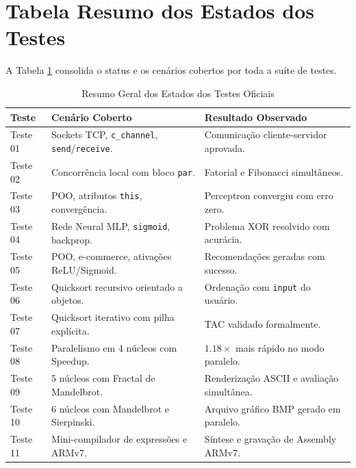 \section{Tabela Resumo dos Estados dos Testes}

A Tabela \ref{tab:resumo_testes} consolida o status e os cenários cobertos por toda a suíte de testes.

\begin{table}[htbp]
\centering
\caption{Resumo Geral dos Estados dos Testes Oficiais}
\label{tab:resumo_testes}
\small
\begin{tabular}{p{2cm}p{6cm}p{5.5cm}}
\toprule
Teste & Cenário Coberto & Resultado Observado \\
\midrule
Teste 01 & Sockets TCP, \texttt{c\_channel}, \texttt{send}/\texttt{receive}. & Comunicação cliente-servidor aprovada. \\
Teste 02 & Concorrência local com bloco \texttt{par}. & Fatorial e Fibonacci simultâneos. \\
Teste 03 & POO, atributos \texttt{this}, convergência. & Perceptron convergiu com erro zero. \\
Teste 04 & Rede Neural MLP, \texttt{sigmoid}, backprop. & Problema XOR resolvido com acurácia. \\
Teste 05 & POO, e-commerce, ativações ReLU/Sigmoid. & Recomendações geradas com sucesso. \\
Teste 06 & Quicksort recursivo orientado a objetos. & Ordenação com \texttt{input} do usuário. \\
Teste 07 & Quicksort iterativo com pilha explícita. & TAC validado formalmente. \\
Teste 08 & Paralelismo em 4 núcleos com Speedup. & $1.18\times$ mais rápido no modo paralelo. \\
Teste 09 & 5 núcleos com Fractal de Mandelbrot. & Renderização ASCII e avaliação simultânea. \\
Teste 10 & 6 núcleos com Mandelbrot e Sierpinski. & Arquivo gráfico BMP gerado em paralelo. \\
Teste 11 & Mini-compilador de expressões e ARMv7. & Síntese e gravação de Assembly ARMv7. \\
\bottomrule
\end{tabular}
\end{table}
